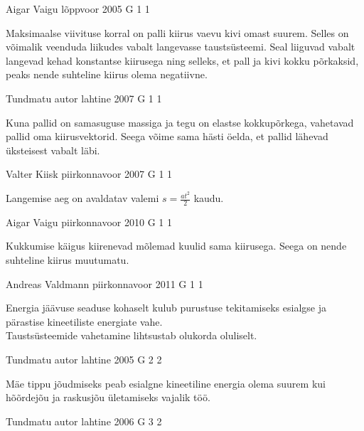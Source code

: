 \documentclass[11pt, twoside]{article}
\begin{document}
{%
{Aigar Vaigu} %
{lõppvoor} %
{2005} %
{G 1} %
{1} %
{

\ifHint
Maksimaalse viivituse korral on palli kiirus vaevu kivi omast suurem. Selles on võimalik veenduda liikudes vabalt langevasse taustsüsteemi. Seal liiguvad vabalt langevad kehad konstantse kiirusega ning selleks, et pall ja kivi kokku põrkaksid, peaks nende suhteline kiirus olema negatiivne.
\fi
}

{Tundmatu autor} %
{lahtine} %
{2007} %
{G 1} %
{1} %
{

\ifHint
Kuna pallid on samasuguse massiga ja tegu on elastse kokkupõrkega, vahetavad pallid oma kiirusvektorid. Seega võime sama hästi öelda, et pallid lähevad üksteisest vabalt läbi.
\fi
}

{Valter Kiisk} %
{piirkonnavoor} %
{2007} %
{G 1} %
{1} %
{

\ifHint
Langemise aeg on avaldatav valemi $s = \frac{at^2}{2}$ kaudu.
\fi
}

{Aigar Vaigu} %
{piirkonnavoor} %
{2010} %
{G 1} %
{1} %
{

\ifHint
Kukkumise käigus kiirenevad mõlemad kuulid sama kiirusega. Seega on nende suhteline kiirus muutumatu.
\fi
}

{Andreas Valdmann} %
{piirkonnavoor} %
{2011} %
{G 1} %
{1} %
{

\ifHint
\osa Energia jäävuse seaduse kohaselt kulub purustuse tekitamiseks esialgse ja pärastise kineetiliste energiate vahe.\\
\osa Taustsüsteemide vahetamine lihtsustab olukorda oluliselt.
\fi
}

{Tundmatu autor} %
{lahtine} %
{2005} %
{G 2} %
{2} %
{

\ifHint
Mäe tippu jõudmiseks peab esialgne kineetiline energia olema suurem kui hõõrdejõu ja raskusjõu ületamiseks vajalik töö.
\fi
}

{Tundmatu autor} %
{lahtine} %
{2006} %
{G 3} %
{2} %
{

}}
\end{document}
